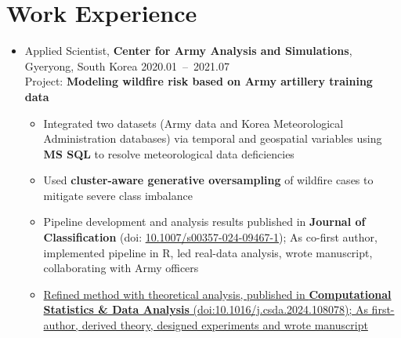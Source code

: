 \documentclass[letterpaper,11pt]{article}
\begin{document}
\section{Work Experience}
\begin{itemize}[leftmargin=0in, label={}]
	\item  Applied Scientist,
	\textbf{Center for Army Analysis and Simulations}, Gyeryong, South Korea
	\hfill
	2020.01~--~2021.07
	\\
	Project:  \textbf{Modeling wildfire risk based on Army artillery training data}
	\vspace{-5.55pt}	
	\begin{itemize}[leftmargin=0.14in]
		\item \small 
		Integrated two datasets (Army   data and Korea Meteorological Administration databases) via temporal and geospatial variables using \textbf{MS SQL}
		to resolve meteorological data deficiencies
		\vspace{-2.55pt}
		\item \small 
		Used \textbf{cluster-aware generative   oversampling} of wildfire cases
		to mitigate severe class imbalance 
		\vspace{-2.55pt}
		\item \small 
		Pipeline development and  analysis results published in \textbf{Journal of Classification} (doi:
		\href{https://doi.org/10.1007/s00357-024-09467-1}{
			10.1007/s00357-024-09467-1}); As co-first author,  implemented   pipeline in R, led real-data analysis, wrote manuscript,
		collaborating with Army officers
		\vspace{-2.55pt}
		\item \small 
		\href{https://doi.org/10.1016/j.csda.2024.108078}{
			Refined method with theoretical analysis, published in \textbf{Computational Statistics \& Data Analysis} (doi:10.1016/j.csda.2024.108078); As first-author, derived theory, designed   experiments and wrote  manuscript}
		
	\end{itemize}
\end{itemize}
\vspace{-12.55pt}
\end{document}
